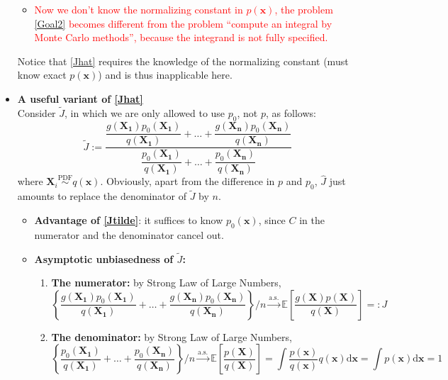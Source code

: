 \documentclass[12pt]{article}
\begin{document}
\begin{itemize}
\begin{itemize}[label=*]
\begin{enumerate}
		\end{enumerate}
		\item \textcolor{red}{Now we don't know the normalizing constant in $p(\bm{x})$, the problem \eqref{Goal2} becomes different from the problem ``compute an integral by Monte Carlo methods'', because the integrand is not fully specified.}
	\end{itemize}
	Notice that \eqref{Jhat} requires the knowledge of the normalizing constant (must know exact $p(\bm{x})$) and is thus inapplicable here.
	\item {\bf A useful variant of \eqref{Jhat}}\\
	Consider $\tilde{J}$, in which we are only allowed to use $p_0$, not $p$, as follows:
	\begin{equation}
	\tilde{J}:=\dfrac{\dfrac{g(\bm{X_1}) p_0(\bm{X_1})}{q(\bm{X_1})} + \ldots + \dfrac{g(\bm{X_n}) p_0(\bm{X_n})}{q(\bm{X_n})}}{\dfrac{p_0(\bm{X_1})}{q(\bm{X_1})} + \ldots + \dfrac{p_0(\bm{X_n})}{q(\bm{X_n})}}   \label{Jtilde}
	\end{equation}
	where $\bm{X}_i\stackrel{\textrm{PDF}}{\sim}q(\bm{x})$. Obviously, apart from the difference in $p$ and $p_0$, $\hat{J}$ just amounts to replace the denominator of $\tilde{J}$ by $n$.
	\begin{itemize}[label=*]
		\item {\bf Advantage of \eqref{Jtilde}}: it suffices to know $p_0(\bm{x})$, since $C$ in the numerator and the denominator cancel out.
		\item {\bf Asymptotic unbiasedness of $\tilde{J}$:}
		\begin{enumerate}
			\item {\bf The numerator:} by Strong Law of Large Numbers,
			\begin{equation}
			\left\{\dfrac{g(\bm{X_1}) p_0(\bm{X_1})}{q(\bm{X_1})} + \ldots + \dfrac{g(\bm{X_n}) p_0(\bm{X_n})}{q(\bm{X_n})}\right\}\Big/ n \stackrel{\textrm{a.s.}}{\to} \mathbb{E}\left[ \frac{g(\bm{X}) p(\bm{X})}{q(\bm{X})} \right] =: J   \label{Denominator}
			\end{equation}
			\item {\bf The denominator:} by Strong Law of Large Numbers,
			\begin{equation}
			\left\{ \dfrac{p_0(\bm{X_1})}{q(\bm{X_1})} + \ldots + \dfrac{p_0(\bm{X_n})}{q(\bm{X_n})} \right\}\Big/ n \stackrel{\textrm{a.s.}}{\to} \mathbb{E}\left[ \frac{p(\bm{X})}{q(\bm{X})} \right] = \int \frac{p(\bm{x})}{q(\bm{x})}q(\bm{x})\textrm{d}\bm{x} = \int p(\bm{x})\textrm{d}\bm{x} = 1   \label{Numerator}

\end{equation}
\end{enumerate}
\end{itemize}
\end{itemize}
\end{document}
